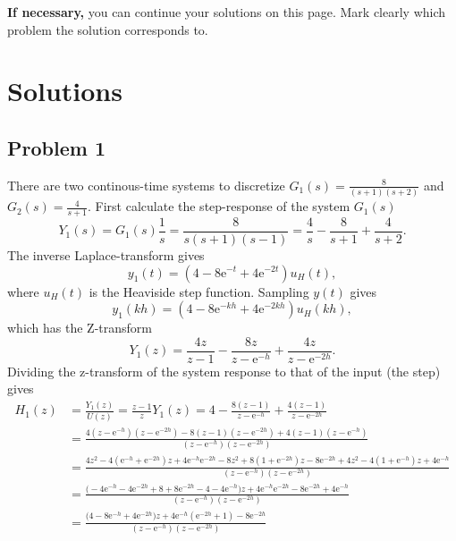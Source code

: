 \documentclass[letter,12pt]{scrartcl}
\newcommand{\bmpl}{\begin{minipage}[t]{\textwidth}}
\newcommand{\emp}{\end{minipage}}
\newcommand*{\mexp}[1]{\ensuremath{\mathrm{e}^{#1}}}
\begin{document}
\noindent
\fbox{
\bmpl
{\bf Motivation:}\\
\vspace*{80mm}
\emp}


\clearpage

\noindent
{\bf If necessary,} you can continue your solutions on this page. Mark clearly which problem the solution corresponds to.



\newpage
\setcounter{page}{1}

\section*{Solutions}
\subsection*{Problem 1}
   There are two continous-time systems to discretize \(G_1(s) = \frac{8}{(s+1)(s+2)}\) and \(G_2(s) = \frac{4}{s+1}\). First calculate the step-response of the system \(G_1(s)\)
   \[Y_1(s) = G_1(s)\frac{1}{s} = \frac{8}{s(s+1)(s-1)} = \frac{4}{s} - \frac{8}{s+1} + \frac{4}{s+2}.\]
   The inverse Laplace-transform gives
   \[ y_1(t) = \left(4 - 8\mexp{-t} +4\mexp{-2t}\right)u_H(t),\]
   where $u_H(t)$ is the Heaviside step function. Sampling $y(t)$ gives
   \[ y_1(kh) = \left(4 - 8\mexp{-kh} +4\mexp{-2kh}\right)u_H(kh),\]
   which has the Z-transform
   \[Y_1(z) = \frac{4z}{z-1} - \frac{8z}{z - \mexp{-h}} + \frac{4z}{z - \mexp{-2h}}.\]
   Dividing the z-transform of the system response to that of the input (the step) gives
   \begin{align*}
   H_1(z) &= \frac{Y_1(z)}{U(z)} = \frac{z-1}{z}Y_1(z) = 4 - \frac{8(z-1)}{z-\mexp{-h}} + \frac{4(z-1)}{z-\mexp{-2h}}\\
        &= \frac{4(z-\mexp{-h})(z-\mexp{-2h}) - 8(z-1)(z-\mexp{-2h}) + 4(z-1)(z-\mexp{-h})}{(z-\mexp{-h})(z-\mexp{-2h})}\\
        &= \frac{4z^2 - 4(\mexp{-h} + \mexp{-2h})z + 4\mexp{-h}\mexp{-2h} - 8z^2 +8(1+\mexp{-2h})z - 8\mexp{-2h} + 4z^2 - 4(1+\mexp{-h})z + 4\mexp{-h}}{(z-\mexp{-h})(z-\mexp{-2h})}\\
        &= \frac{ \big( - 4\mexp{-h} -4\mexp{-2h} +8 + 8\mexp{-2h} -4 -4\mexp{-h}\big) z + 4\mexp{-h}\mexp{-2h} -8\mexp{-2h} +4\mexp{-h}}{(z-\mexp{-h})(z-\mexp{-2h})}\\
        &= \frac{ \big( 4 - 8\mexp{-h} +4\mexp{-2h}\big) z + 4\mexp{-h}(\mexp{-2h} +1 ) -8\mexp{-2h}}{(z-\mexp{-h})(z-\mexp{-2h})}
   \end{align*}
\end{document}
